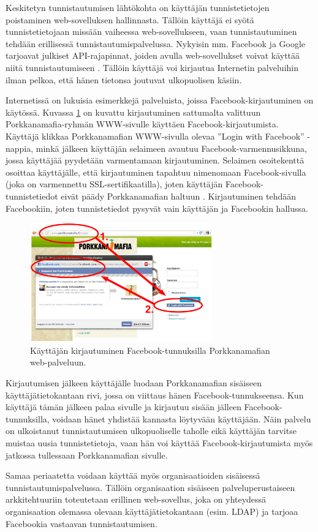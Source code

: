 Keskitetyn tunnistautumisen lähtökohta on käyttäjän tunnistetietojen poistaminen web-sovelluksen hallinnasta. Tällöin käyttäjä ei syötä tunnistetietojaan missään vaiheessa web-sovellukseen, vaan tunnistautuminen tehdään erillisessä tunnistautumispalvelussa. Nykyisin mm. Facebook ja Google tarjoavat julkiset API-rajapinnat, joiden avulla web-sovellukset voivat käyttää niitä tunnistautumiseen \cite{facebook}. Tällöin käyttäjä voi kirjautua Internetin palveluihin ilman pelkoa, että hänen tietonsa joutuvat ulkopuolisen käsiin.

Internetissä on lukuisia esimerkkejä palveluista, joissa Facebook-kirjautuminen on käytössä. Kuvassa \ref{facebook_login} on kuvattu kirjautuminen sattumalta valittuun Porkkanamafia-ryhmän WWW-sivulle käyttäen Facebook-kirjautumista. Käyttäjä klikkaa Porkkanamafian WWW-sivulla olevaa ''Login with Facebook'' -nappia, minkä jälkeen käyttäjän selaimeen avautuu Facebook-varmennusikkuna, jossa käyttäjää pyydetään varmentamaan kirjautuminen. Selaimen osoitekenttä osoittaa käyttäjälle, että kirjautuminen tapahtuu nimenomaan Facebook-sivulla (joka on varmennettu SSL-sertifikaatilla), joten käyttäjän Facebook-tun\-nis\-te\-tie\-dot eivät päädy Porkkanamafian haltuun \cite{facebook}. Kirjautuminen tehdään Facebookiin, joten tunnistetiedot pysyvät vain käyttäjän ja Facebookin hallussa.

\begin{figure}[!b]
\centering
\includegraphics[width=0.7\textwidth]{tunnistautuminen/keskitetty/facebook.eps}
\caption{Käyttäjän kirjautuminen Facebook-tunnuksilla Porkkanamafian web-palveluun.}%
\label{facebook_login}
\end{figure}

Kirjautumisen jälkeen käyttäjälle luodaan Porkkanamafian sisäiseen käyttäjätietokantaan rivi, jossa on viittaus hänen Facebook-tunnukseensa. Kun käyttäjä tämän jälkeen palaa sivulle ja kirjautuu sisään jälleen Facebook-tunnuksilla, voidaan hänet yhdistää kannasta löytyvään käyttäjään. Näin palvelu on ulkoistanut tunnistautumisen ulkopuoliselle taholle eikä käyttäjän tarvitse muistaa uusia tunnistetietoja, vaan hän voi käyttää Facebook-kirjautumista myös jatkossa tullessaan Porkkanamafian sivulle.

Samaa periaatetta voidaan käyttää myös organisaatioiden sisäisessä tunnistautumispalvelussa. Tällöin organisaation sisäiseen palveluperustaiseen arkkitehtuuriin toteutetaan erillinen web-sovellus, joka on yhteydessä organisaation olemassa olevaan käyttäjätietokantaan (esim. LDAP) ja tarjoaa Facebookia vastaavan tunnistautumisen.